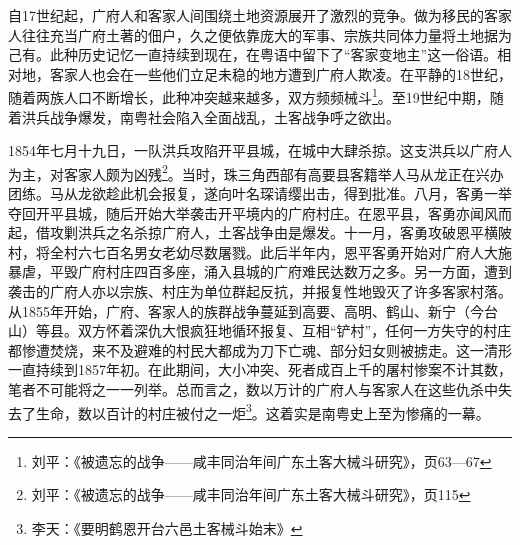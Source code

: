 自17世纪起，广府人和客家人间围绕土地资源展开了激烈的竞争。做为移民的客家人往往充当广府土著的佃户，久之便依靠庞大的军事、宗族共同体力量将土地据为己有。此种历史记忆一直持续到现在，在粤语中留下了“客家变地主”这一俗语。相对地，客家人也会在一些他们立足未稳的地方遭到广府人欺凌。在平静的18世纪，随着两族人口不断增长，此种冲突越来越多，双方频频械斗\footnote{刘平：《被遗忘的战争——咸丰同治年间广东土客大械斗研究》，页63—67}。至19世纪中期，随着洪兵战争爆发，南粤社会陷入全面战乱，土客战争呼之欲出。

1854年七月十九日，一队洪兵攻陷开平县城，在城中大肆杀掠。这支洪兵以广府人为主，对客家人颇为凶残\footnote{刘平：《被遗忘的战争——咸丰同治年间广东土客大械斗研究》，页115}。当时，珠三角西部有高要县客籍举人马从龙正在兴办团练。马从龙欲趁此机会报复，遂向叶名琛请缨出击，得到批准。八月，客勇一举夺回开平县城，随后开始大举袭击开平境内的广府村庄。在恩平县，客勇亦闻风而起，借攻剿洪兵之名杀掠广府人，土客战争由是爆发。十一月，客勇攻破恩平横陂村，将全村六七百名男女老幼尽数屠戮。此后半年内，恩平客勇开始对广府人大施暴虐，平毁广府村庄四百多座，涌入县城的广府难民达数万之多。另一方面，遭到袭击的广府人亦以宗族、村庄为单位群起反抗，并报复性地毁灭了许多客家村落。从1855年开始，广府、客家人的族群战争蔓延到高要、高明、鹤山、新宁（今台山）等县。双方怀着深仇大恨疯狂地循环报复、互相“铲村”，任何一方失守的村庄都惨遭焚烧，来不及避难的村民大都成为刀下亡魂、部分妇女则被掳走。这一清形一直持续到1857年初。在此期间，大小冲突、死者成百上千的屠村惨案不计其数，笔者不可能将之一一列举。总而言之，数以万计的广府人与客家人在这些仇杀中失去了生命，数以百计的村庄被付之一炬\footnote{李天：《要明鹤恩开台六邑土客械斗始末》}。这着实是南粤史上至为惨痛的一幕。

